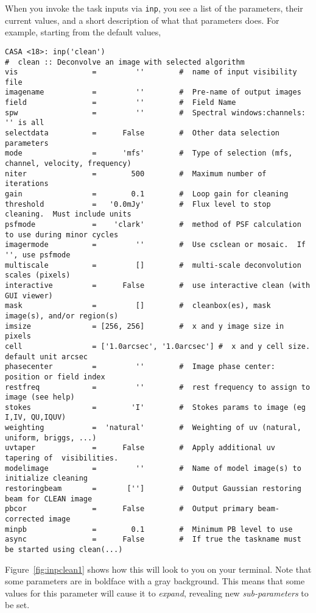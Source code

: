 % 



When you invoke the task inputs via {\tt inp}, you see a list of
the parameters, their current values, and a short description of what
that parameters does.  For example, starting from the default values,
\small
\begin{verbatim}
CASA <18>: inp('clean')
#  clean :: Deconvolve an image with selected algorithm
vis                 =         ''        #  name of input visibility file
imagename           =         ''        #  Pre-name of output images
field               =         ''        #  Field Name
spw                 =         ''        #  Spectral windows:channels: '' is all
selectdata          =      False        #  Other data selection parameters
mode                =      'mfs'        #  Type of selection (mfs, channel, velocity, frequency)
niter               =        500        #  Maximum number of iterations
gain                =        0.1        #  Loop gain for cleaning
threshold           =   '0.0mJy'        #  Flux level to stop cleaning.  Must include units
psfmode             =    'clark'        #  method of PSF calculation to use during minor cycles
imagermode          =         ''        #  Use csclean or mosaic.  If '', use psfmode
multiscale          =         []        #  multi-scale deconvolution scales (pixels)
interactive         =      False        #  use interactive clean (with GUI viewer)
mask                =         []        #  cleanbox(es), mask image(s), and/or region(s)
imsize              = [256, 256]        #  x and y image size in pixels
cell                = ['1.0arcsec', '1.0arcsec'] #  x and y cell size. default unit arcsec
phasecenter         =         ''        #  Image phase center: position or field index
restfreq            =         ''        #  rest frequency to assign to image (see help)
stokes              =        'I'        #  Stokes params to image (eg I,IV, QU,IQUV)
weighting           =  'natural'        #  Weighting of uv (natural, uniform, briggs, ...)
uvtaper             =      False        #  Apply additional uv tapering of  visibilities.
modelimage          =         ''        #  Name of model image(s) to initialize cleaning
restoringbeam       =       ['']        #  Output Gaussian restoring beam for CLEAN image
pbcor               =      False        #  Output primary beam-corrected image
minpb               =        0.1        #  Minimum PB level to use
async               =      False        #  If true the taskname must be started using clean(...)
\end{verbatim}
\normalsize
Figure~\ref{fig:inpclean1} shows how this will look to you on your
terminal.  Note that some parameters are in boldface with a gray
background.  This means that some values for this parameter will 
cause it to {\it expand}, revealing new {\it sub-parameters} to 
be set.

